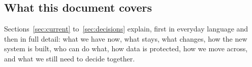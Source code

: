 \subsection*{What this document covers}

Sections~\ref{sec:current} to~\ref{sec:decisions} explain, first in everyday language and
then in full detail: what we have now, what stays, what changes, how the new system is
built, who can do what, how data is protected, how we move across, and what we still need
to decide together.
